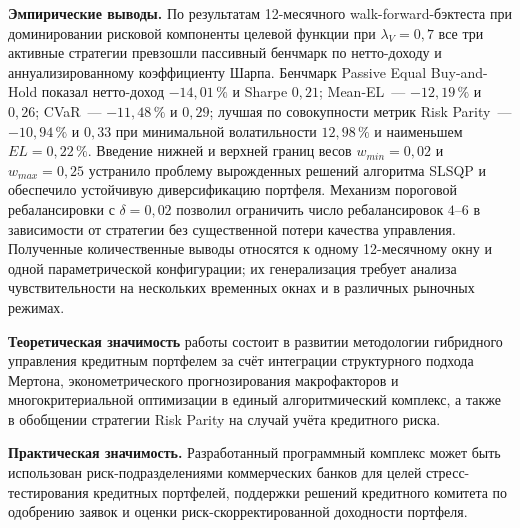 \documentclass[]{article}
\begin{document}
	\textbf{Эмпирические выводы.}
	По результатам 12-месячного walk-forward-бэктеста при доминировании рисковой компоненты
	целевой функции при $\lambda_V = 0{,}7$ все три активные стратегии превзошли пассивный
	бенчмарк по нетто-доходу и аннуализированному коэффициенту Шарпа. Бенчмарк
	Passive Equal Buy-and-Hold показал нетто-доход $-14{,}01\,\%$ и Sharpe $0{,}21$;
	Mean-EL~--- $-12{,}19\,\%$ и $0{,}26$; CVaR~--- $-11{,}48\,\%$ и $0{,}29$;
	лучшая по совокупности метрик Risk Parity~--- $-10{,}94\,\%$ и $0{,}33$ при
	минимальной волатильности $12{,}98\,\%$ и наименьшем $EL = 0{,}22\,\%$. Введение нижней и
	верхней границ весов $w_{min} = 0{,}02$ и $w_{max} = 0{,}25$ устранило проблему
	вырожденных решений алгоритма SLSQP и обеспечило устойчивую диверсификацию портфеля.
	Механизм пороговой ребалансировки с $\delta = 0{,}02$ позволил ограничить число
	ребалансировок $4$--$6$ в зависимости от стратегии без существенной потери качества
	управления. Полученные количественные выводы относятся к одному 12-месячному окну и
	одной параметрической конфигурации; их генерализация требует анализа чувствительности
	на нескольких временных окнах и в различных рыночных режимах.

	\textbf{Теоретическая значимость} работы состоит в развитии методологии гибридного
	управления кредитным портфелем за счёт интеграции структурного подхода Мертона,
	эконометрического прогнозирования макрофакторов и многокритериальной оптимизации
	в единый алгоритмический комплекс, а также в обобщении стратегии Risk Parity на
	случай учёта кредитного риска.

	\textbf{Практическая значимость.} Разработанный программный комплекс может быть использован
	риск-подразделениями коммерческих банков для целей стресс-тестирования кредитных
	портфелей, поддержки решений кредитного комитета по одобрению заявок и оценки
	риск-скорректированной доходности портфеля.
\end{document}
